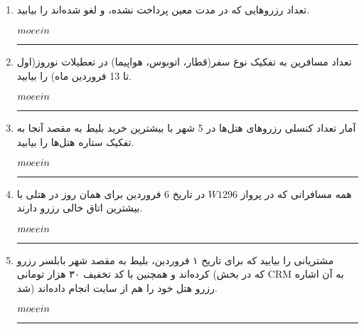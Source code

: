 \begin{enumerate}
	
	\item
	تعداد رزروهایی که در مدت معین پرداخت نشده، و لغو شده‌اند را بیابید.
	
	\setLTR
	$moeein\\$
	\setRTL
	\rule{\linewidth}{0.05mm}
	
	
	
	
	\item
	تعداد مسافرین به تفکیک نوع سفر(قطار، اتوبوس، هواپیما) در تعطیلات نوروز(اول تا 13 فروردین ماه) را بیابید.
	
	\setLTR
	$moeein\\$
	\setRTL
	\rule{\linewidth}{0.05mm}
	
	
	
	
	\item
	آمار تعداد کنسلی رزروهای هتل‌ها در 5 شهر با بیشترین خرید بلیط به مقصد آنجا به‌ تفکیک ستاره هتل‌ها را بیابید.
	
	\setLTR
	$moeein\\$
	\setRTL
	\rule{\linewidth}{0.05mm}	 
	
	
	
	\item
	همه مسافرانی که در پرواز $W1296$ در تاریخ 6 فروردین برای همان روز در هتلی با بیشترین اتاق خالی رزرو دارند.
	
	\setLTR
	$moeein\\$
	\setRTL
	\rule{\linewidth}{0.05mm}
	
	
	
	\item
	مشتریانی را بیابید که برای تاریخ ۱ فروردین، بلیط به مقصد شهر بابلسر رزرو کرده‌اند و همچنین \linebreak با کد تخفیف ۳۰ هزار تومانی (که در بخش CRM به‌ آن اشاره شد) رزرو هتل خود را هم از سایت انجام داده‌اند.
	
	\setLTR
	$moeein\\$
	\setRTL
	\rule{\linewidth}{0.05mm}	 
	
	
	
\end{enumerate}
